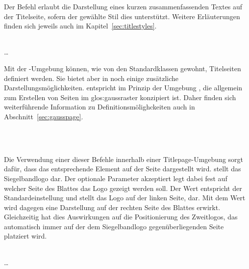 Der Befehl  erlaubt die Darstellung eines kurzen zusammenfassenden Textes auf der Titelseite, sofern der gewählte Stil dies unterstützt.
Weitere Erläuterungen finden sich jeweils auch im Kapitel~\ref{sec:titlestyles}.


\begin{Declaration}
  \\
  \quad\dots\\
\end{Declaration}

Mit der -Umgebung können, wie von den Standardklassen
gewohnt, Titelseiten definiert werden. Sie bietet aber in \tubslatex noch einige
zusätzliche Darstellungsmöglichkeiten.  entspricht
im Prinzip der Umgebung , die allgemein zum Erstellen
von Seiten im \gls{glos:gaussraster} konzipiert ist. Daher finden sich
weiterführende Information zu Definitionsmölighckeiten auch in
Abschnitt~\ref{sec:gausspage}.

\begin{Declaration}
  \\
  \\
\end{Declaration}

Die Verwendung einer dieser Befehle innerhalb einer Titlepage-Umgebung sorgt
dafür, dass das entsprechende Element auf der Seite dargestellt wird.
 stellt das Siegelbandlogo dar. Der optionale Parameter
 akzeptiert legt dabei fest auf welcher Seite des Blattes
das Logo gezeigt werden soll. Der Wert  entspricht der Standardeinstellung und stellt das Logo auf der linken Seite,
dar.
Mit dem Wert  wird dagegen eine Darstellung auf der rechten
Seite des Blattes erwirkt. Gleichzeitig hat dies Auswirkungen
auf die Positionierung des Zweitlogos, das automatisch immer auf der 
dem Siegelbandlogo gegenüberliegenden Seite platziert wird.

\begin{Declaration}
\end{Declaration}


\begin{Declaration}
    \\
  \quad\dots\\
\end{Declaration}

